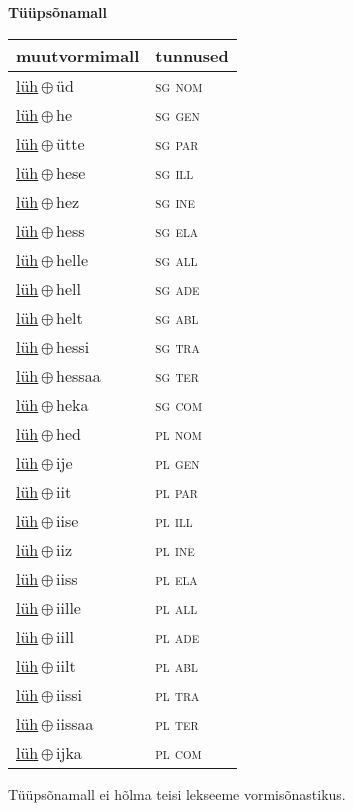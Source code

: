 

\vspace{3.5em}
\noindent \begin{minipage}{\textwidth}
\noindent \textbf{Tüüpsõnamall \,}\\

\begin{sideways}
\begin{tabular}{l l}
muutvormimall & tunnused \\
\hline
\underline{lüh}\,$\oplus$\,üd & \textsc{ sg nom } \\
\underline{lüh}\,$\oplus$\,he & \textsc{ sg gen } \\
\underline{lüh}\,$\oplus$\,ütte & \textsc{ sg par } \\
\underline{lüh}\,$\oplus$\,hese & \textsc{ sg ill } \\
\underline{lüh}\,$\oplus$\,hez & \textsc{ sg ine } \\
\underline{lüh}\,$\oplus$\,hess & \textsc{ sg ela } \\
\underline{lüh}\,$\oplus$\,helle & \textsc{ sg all } \\
\underline{lüh}\,$\oplus$\,hell & \textsc{ sg ade } \\
\underline{lüh}\,$\oplus$\,helt & \textsc{ sg abl } \\
\underline{lüh}\,$\oplus$\,hessi & \textsc{ sg tra } \\
\underline{lüh}\,$\oplus$\,hessaa & \textsc{ sg ter } \\
\underline{lüh}\,$\oplus$\,heka & \textsc{ sg com } \\
\underline{lüh}\,$\oplus$\,hed & \textsc{ pl nom } \\
\underline{lüh}\,$\oplus$\,ije & \textsc{ pl gen } \\
\underline{lüh}\,$\oplus$\,iit & \textsc{ pl par } \\
\underline{lüh}\,$\oplus$\,iise & \textsc{ pl ill } \\
\underline{lüh}\,$\oplus$\,iiz & \textsc{ pl ine } \\
\underline{lüh}\,$\oplus$\,iiss & \textsc{ pl ela } \\
\underline{lüh}\,$\oplus$\,iille & \textsc{ pl all } \\
\underline{lüh}\,$\oplus$\,iill & \textsc{ pl ade } \\
\underline{lüh}\,$\oplus$\,iilt & \textsc{ pl abl } \\
\underline{lüh}\,$\oplus$\,iissi & \textsc{ pl tra } \\
\underline{lüh}\,$\oplus$\,iissaa & \textsc{ pl ter } \\
\underline{lüh}\,$\oplus$\,ijka & \textsc{ pl com } \\
\end{tabular}
\end{sideways}
\label{tab:tüüpsõnamall-lühüd}

\end{minipage}

 
\vspace{1em}
\noindent Tüüpsõnamall  ei hõlma teisi lekseeme vormi\-sõnastikus.
